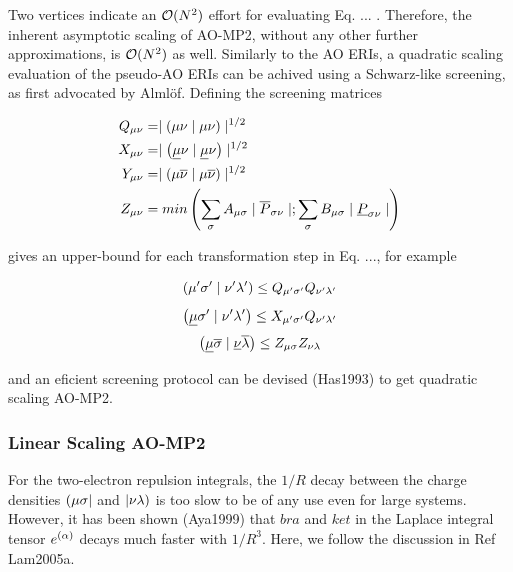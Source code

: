 \noindent Two vertices indicate an $\mathcal{O}(N^{2})$ effort for evaluating Eq. ... . Therefore, the inherent asymptotic scaling of AO-MP2, without any other further approximations, is $\mathcal{O}(N^{2})$ as well. Similarly to the AO ERIs, a quadratic scaling evaluation of the pseudo-AO ERIs can be achived using a Schwarz-like screening, as first advocated by Almlöf. Defining the screening matrices

\begin{equation}
\begin{split}
Q_{\mu\nu} &= \mid \left( \mu\nu \mid \mu\nu \right) \mid ^{1/2} \\
X_{\mu\nu} &= \mid \left( \underline{\mu}\nu \mid \underline{\mu}\nu \right) \mid ^{1/2} \\
Y_{\mu\nu} &= \mid \left( \mu\overline{\nu} \mid \mu\overline{\nu} \right) \mid ^{1/2} \\
Z_{\mu\nu} &= min\left( \sum_{\sigma} A_{\mu\sigma} \mid \overline{P}_{\sigma\nu} \mid; \sum_{\sigma} B_{\mu \sigma} \mid \underline{P}_{\sigma\nu} \mid \right)
\end{split}
\end{equation} 

\noindent gives an upper-bound for each transformation step in Eq. ..., for example 

\begin{equation}
\left( \mu'\sigma' \mid \nu'\lambda' \right) \leq Q_{\mu'\sigma'}Q_{\nu'\lambda'}
\end{equation}
\begin{equation}
\left( \underline{\mu}\sigma' \mid \nu'\lambda' \right) \leq X_{\mu'\sigma'}Q_{\nu'\lambda'}
\end{equation}
\begin{equation}
\left( \underline{\mu} \overline{\sigma} \mid \underline{\nu}\overline{\lambda} \right) \leq Z_{\mu\sigma} Z_{\nu\lambda}
\end{equation}

\noindent and an eficient screening protocol can be devised (Has1993) to get quadratic scaling AO-MP2.

\subsubsection{Linear Scaling AO-MP2}

For the two-electron repulsion integrals, the $1/R$ decay between the charge densities $\left( \mu\sigma \right\rvert$ and $\left\lvert \nu\lambda \right)$ is too slow to be of any use even for large systems. However, it has been shown (Aya1999) that $bra$ and $ket$ in the Laplace integral tensor $e^{(\alpha)}$ decays much faster with $1/R^3$. Here, we follow the discussion in Ref Lam2005a. 


